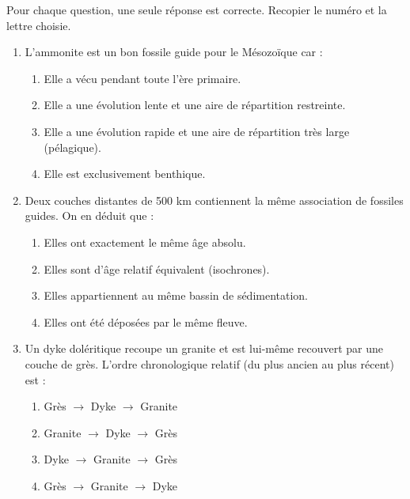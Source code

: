 \documentclass[11pt]{article}
\begin{document}
\begin{exercice}
Pour chaque question, une seule réponse est correcte. Recopier le numéro et la lettre choisie.
\begin{enumerate}
    \item L'ammonite est un bon fossile guide pour le Mésozoïque car :
    \begin{enumerate}
        \item Elle a vécu pendant toute l'ère primaire.
        \item Elle a une évolution lente et une aire de répartition restreinte.
        \item Elle a une évolution rapide et une aire de répartition très large (pélagique).
        \item Elle est exclusivement benthique.
    \end{enumerate}
    \item Deux couches distantes de 500 km contiennent la même association de fossiles guides. On en déduit que :
    \begin{enumerate}
        \item Elles ont exactement le même âge absolu.
        \item Elles sont d'âge relatif équivalent (isochrones).
        \item Elles appartiennent au même bassin de sédimentation.
        \item Elles ont été déposées par le même fleuve.
    \end{enumerate}
    \item Un dyke doléritique recoupe un granite et est lui-même recouvert par une couche de grès. L'ordre chronologique relatif (du plus ancien au plus récent) est :
    \begin{enumerate}
        \item Grès $\rightarrow$ Dyke $\rightarrow$ Granite
        \item Granite $\rightarrow$ Dyke $\rightarrow$ Grès
        \item Dyke $\rightarrow$ Granite $\rightarrow$ Grès
        \item Grès $\rightarrow$ Granite $\rightarrow$ Dyke
    \end{enumerate}
\end{enumerate}
\end{exercice}
\end{document}
